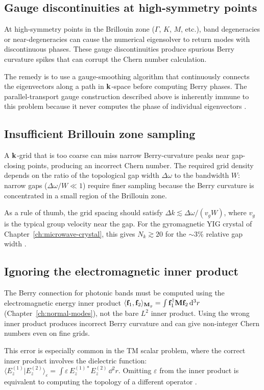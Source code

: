 \subsection{Gauge discontinuities at high-symmetry points}
\label{sec:appC-gauge-pitfalls}

At high-symmetry points in the Brillouin zone ($\Gamma$, $K$, $M$,
etc.), band degeneracies or near-degeneracies can cause the
numerical eigensolver to return modes with discontinuous phases.
These gauge discontinuities produce spurious Berry curvature spikes
that can corrupt the Chern number calculation.

The remedy is to use a gauge-smoothing algorithm that continuously
connects the eigenvectors along a path in $\mathbf{k}$-space before
computing Berry phases.  The parallel-transport gauge construction
described above is inherently immune to this
problem because it never computes the phase of individual eigenvectors
\cite{lee2022calculation,zhao2020first}.

\subsection{Insufficient Brillouin zone sampling}
\label{sec:appC-sampling-pitfalls}

A $\mathbf{k}$-grid that is too coarse can miss narrow Berry-curvature
peaks near gap-closing points, producing an incorrect Chern number.
The required grid density depends on the ratio of the topological
gap width $\Delta\omega$ to the bandwidth $W$: narrow gaps
($\Delta\omega/W\ll 1$) require finer sampling because the Berry
curvature is concentrated in a small region of the Brillouin zone.

As a rule of thumb, the grid spacing should satisfy
$\Delta k \lesssim \Delta\omega/(v_g W)$, where $v_g$ is the
typical group velocity near the gap.  For the gyromagnetic YIG
crystal of Chapter~\ref{ch:microwave-crystal}, this gives
$N_k\gtrsim 20$ for the $\sim 3\%$ relative gap width
\cite{zhao2020first,gangaraj2016berry}.

\subsection{Ignoring the electromagnetic inner product}
\label{sec:appC-inner-product-pitfall}

The Berry connection for photonic bands must be computed using the
electromagnetic energy inner product
$\langle \mathbf{f}_1 , \mathbf{f}_2 \rangle_{\mathbf{M}_g}=\int\mathbf{f}_1^\dagger\mathbf{M}\mathbf{f}_2\,
\mathrm{d}^3r$ (Chapter~\ref{ch:normal-modes}), not the bare $L^2$ inner
product.  Using the wrong inner product produces incorrect Berry
curvature and can give non-integer Chern numbers even on fine grids.

This error is especially common in the TM scalar problem, where the
correct inner product involves the dielectric function:
$\langle E_z^{(1)}|E_z^{(2)}\rangle_\varepsilon
=\int\varepsilon\,E_z^{(1)*}E_z^{(2)}\,\dd^2 r$.  Omitting
$\varepsilon$ from the inner product is equivalent to computing
the topology of a different operator
\cite{nittis2020equivalence,raman2010photonic}.
